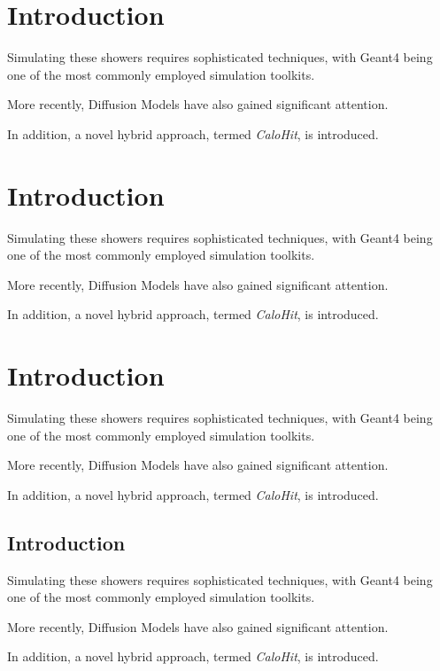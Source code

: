 \chapter{Introduction}
\label{chap:introduction}


Simulating these showers requires sophisticated techniques, with Geant4 \parencite{geant_simul_toolkit} being one of the most commonly employed simulation toolkits.

More recently, Diffusion Models \parencite{Sohl-Dickstein:2015dhe} have also gained significant attention.

In addition, a novel hybrid approach, termed \emph{CaloHit}, is introduced.
\chapter{Introduction}
\label{chap:introduction}


Simulating these showers requires sophisticated techniques, with Geant4 \parencite{geant_simul_toolkit} being one of the most commonly employed simulation toolkits.

More recently, Diffusion Models \parencite{Sohl-Dickstein:2015dhe} have also gained significant attention.

In addition, a novel hybrid approach, termed \emph{CaloHit}, is introduced.
\chapter{Introduction}
\label{chap:introduction}


Simulating these showers requires sophisticated techniques, with Geant4 \parencite{geant_simul_toolkit} being one of the most commonly employed simulation toolkits.

More recently, Diffusion Models \parencite{Sohl-Dickstein:2015dhe} have also gained significant attention.

In addition, a novel hybrid approach, termed \emph{CaloHit}, is introduced.
\begin{frame}[t]
\chapter{Introduction}
\label{chap:introduction}


Simulating these showers requires sophisticated techniques, with Geant4 \parencite{geant_simul_toolkit} being one of the most commonly employed simulation toolkits.

More recently, Diffusion Models \parencite{Sohl-Dickstein:2015dhe} have also gained significant attention.

In addition, a novel hybrid approach, termed \emph{CaloHit}, is introduced.
\end{frame}

